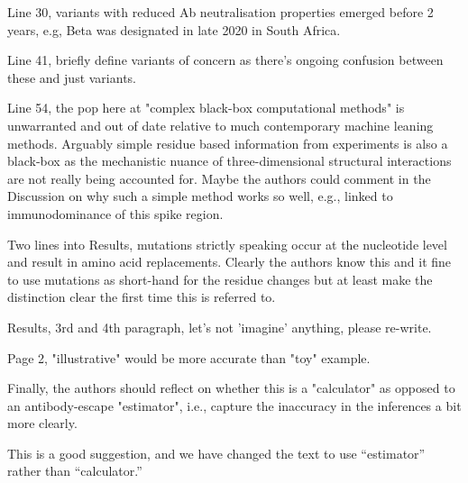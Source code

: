 \documentclass[11pt, oneside]{article}   	%
\newcommand{\response}[1]{{\color{black}#1}}
\begin{document}
Line 30, variants with reduced Ab neutralisation properties emerged before 2 years, e.g, Beta was designated in late 2020 in South Africa.

Line 41, briefly define variants of concern as there's ongoing confusion between these and just variants.

Line 54, the pop here at "complex black-box computational methods" is unwarranted and out of date relative to much contemporary machine leaning methods. Arguably simple residue based information from experiments is also a black-box as the mechanistic nuance of three-dimensional structural interactions are not really being accounted for. Maybe the authors could comment in the Discussion on why such a simple method works so well, e.g., linked to immunodominance of this spike region.

Two lines into Results, mutations strictly speaking occur at the nucleotide level and result in amino acid replacements. Clearly the authors know this and it fine to use mutations as short-hand for the residue changes but at least make the distinction clear the first time this is referred to.

Results, 3rd and 4th paragraph, let's not 'imagine' anything, please re-write.

Page 2, "illustrative" would be more accurate than "toy" example.

Finally, the authors should reflect on whether this is a "calculator" as opposed to an antibody-escape "estimator", i.e., capture the inaccuracy in the inferences a bit more clearly.

\response{This is a good suggestion, and we have changed the text to use ``estimator'' rather than ``calculator.''}

\color{black}

{\small

}
\end{document}
